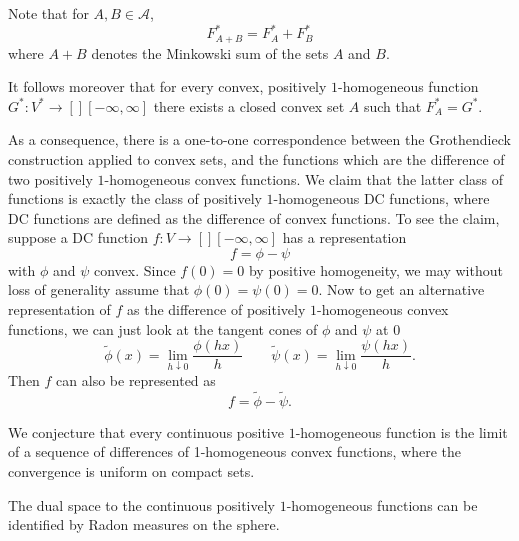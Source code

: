 \documentclass[12pt]{amsart}
\begin{document}
Note that for $A, B \in \mathcal{A}$,
\[
F^*_{A + B} = F^*_A + F^*_B
\]
where $A+B$ denotes the Minkowski sum of the sets $A$ and $B$.

It follows moreover that for every convex, positively $1$-homogeneous function $G^*: V^* \to[] [-\infty, \infty]$ there exists a closed convex set $A$ such that $F_A^* = G^*$.

As a consequence, there is a one-to-one correspondence between the Grothendieck construction applied to convex sets, and the functions which are the difference of two positively $1$-homogeneous convex functions. We claim that the latter class of functions is exactly the class of positively $1$-homogeneous $\mathrm{DC}$ functions, where $\mathrm{DC}$ functions are defined as the difference of convex functions. To see the claim, suppose a $\mathrm{DC}$ function $f : V \to[] [-\infty, \infty]$ has a representation 
\[
f = \phi - \psi
\]
with $\phi$ and $\psi$ convex. Since $f(0) = 0$ by positive homogeneity, we may without loss of generality assume that $\phi(0) = \psi(0) = 0$. Now to get an alternative representation of $f$ as the difference of positively $1$-homogeneous convex functions, we can just look at the tangent cones of $\phi$ and $\psi$ at $0$
\[
\tilde{\phi}(x) = \lim_{h \downarrow 0 } \frac{\phi(h x)}{h}  \qquad \tilde{\psi}(x) = \lim_{h \downarrow 0 } \frac{\psi(h x)}{h}.
\]
Then $f$ can also be represented as
\[
f = \tilde{\phi} - \tilde{\psi}.
\]

We conjecture that every continuous positive $1$-homogeneous function is the limit of a sequence of differences of 1-homogeneous convex functions, where the convergence is uniform on compact sets. 

The dual space to the continuous positively $1$-homogeneous functions can be identified by Radon measures on the sphere.
\end{document}

